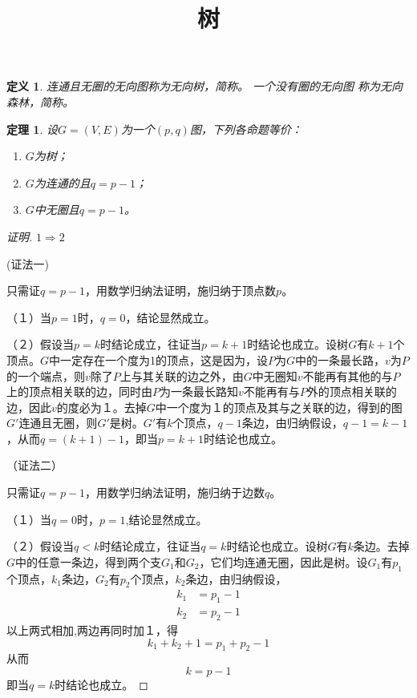 \documentclass{book}[oneside]
\newtheorem{Def}{定义}
\newtheorem{Thm}{定理}
\begin{document}
\begin{CJK*}{UTF8}{gbsn}
  \title{树}
  \author{}
  \date{}
  \maketitle
  


  \setcounter{chapter}{6}
  \begin{Def}
    连通且无圈的无向图称为无向树，简称{}。 一个没有圈的无向图
    称为无向森林，简称{}。
  \end{Def}

  \begin{Thm}
  设$G=(V,E)$为一个$(p,q)$图，下列各命题等价：
  \begin{enumerate}
  \item $G$为树；
  \item $G$为连通的且$q = p - 1$；
  \item $G$中无圈且$q = p - 1$。
  \end{enumerate}
\end{Thm}
\begin{proof}[证明]  \mbox{}\par{}

  $1\Rightarrow2$

  (证法一)
  
    只需证$q=p-1$，用数学归纳法证明，施归纳于顶点数$p$。
    
    （１）当$p=1$时，$q=0$，结论显然成立。

    （２）假设当$p=k$时结论成立，往证当$p=k+1$时结论也成立。设树$G$有$k+1$个顶点。$G$中一定存在一个度为1的顶点，这是因为，设$P$为$G$中的一条最长路，$v$为$P$的一个端点，则$v$除了$P$上与其关联的边之外，由$G$中无圈知$v$不能再有其他的与$P$上的顶点相关联的边，同时由$P$为一条最长路知$v$不能再有与$P$外的顶点相关联的边，因此$v$的度必为１。去掉$G$中一个度为１的顶点及其与之关联的边，得到的图$G'$连通且无圈，则$G'$是树。$G'$有$k$个顶点，$q-1$条边，由归纳假设，$q-1 = k - 1$，从而$q = (k +1) - 1$，即当$p=k+1$时结论也成立。

    （证法二）
    
    只需证$q=p-1$，用数学归纳法证明，施归纳于边数$q$。
    
    （１）当$q=0$时，$p=1$,结论显然成立。

    （２）假设当$q<k$时结论成立，往证当$q=k$时结论也成立。设树$G$有$k$条边。去掉$G$中的任意一条边，得到两个支$G_1$和$G_2$，它们均连通无圈，因此是树。设$G_1$有$p_1$个顶点，$k_1$条边，$G_2$有$p_2$个顶点，$k_2$条边，由归纳假设，
    \begin{equation*}
      \begin{split}
        k_1 &= p_1 - 1\\
        k_2 &= p_2 - 1
      \end{split}
    \end{equation*}
    以上两式相加,两边再同时加１，得
    \[k_1 + k_2  + 1 = p_1 + p_2 - 1\]
    从而
    \[k = p - 1 \]
    即当$q=k$时结论也成立。




\end{proof}
\end{CJK*}
\end{document}
